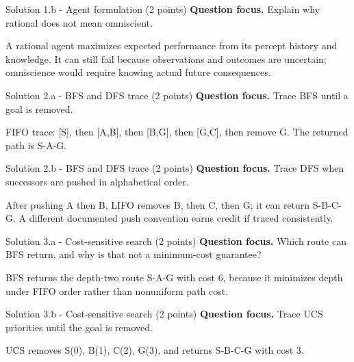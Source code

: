 \documentclass[aspectratio=169,11pt]{beamer}
\begin{document}
\begin{frame}{Solution 1.b - Agent formulation (2 points)}
\small
\textbf{Question focus.} Explain why rational does not mean omniscient.

\vspace{0.25cm}
\answerlabel A rational agent maximizes expected performance from its percept history and knowledge. It can still fail because observations and outcomes are uncertain; omniscience would require knowing actual future consequences.
\end{frame}

\begin{frame}{Solution 2.a - BFS and DFS trace (2 points)}
\small
\textbf{Question focus.} Trace BFS until a goal is removed.

\vspace{0.25cm}
\answerlabel FIFO trace: [S], then [A,B], then [B,G], then [G,C], then remove G. The returned path is S-A-G.
\end{frame}

\begin{frame}{Solution 2.b - BFS and DFS trace (2 points)}
\small
\textbf{Question focus.} Trace DFS when successors are pushed in alphabetical order.

\vspace{0.25cm}
\answerlabel After pushing A then B, LIFO removes B, then C, then G; it can return S-B-C-G. A different documented push convention earns credit if traced consistently.
\end{frame}

\begin{frame}{Solution 3.a - Cost-sensitive search (2 points)}
\small
\textbf{Question focus.} Which route can BFS return, and why is that not a minimum-cost guarantee?

\vspace{0.25cm}
\answerlabel BFS returns the depth-two route S-A-G with cost 6, because it minimizes depth under FIFO order rather than nonuniform path cost.
\end{frame}

\begin{frame}{Solution 3.b - Cost-sensitive search (2 points)}
\small
\textbf{Question focus.} Trace UCS priorities until the goal is removed.

\vspace{0.25cm}
\answerlabel UCS removes S(0), B(1), C(2), G(3), and returns S-B-C-G with cost 3.
\end{frame}
\end{document}
